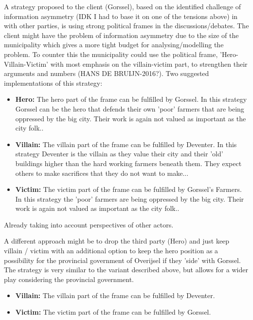 A strategy proposed to the client (Gorssel), based on the identified challenge of information asymmetry (IDK I had to base it on one of the tensions above) in with other parties, is using strong political frames in the discussions/debates. The client might have the problem of information asymmetry due to the size of the municipality which gives a more tight budget for analysing/modelling the problem. To counter this the municipality could use the political frame, 'Hero-Villain-Victim' with most emphasis on the villain-victim part, to strengthen their arguments and numbers (HANS DE BRUIJN-2016?). Two suggested implementations of this strategy:
\begin{itemize}
    \item \textbf{Hero:} The hero part of the frame can be fulfilled by Gorssel. In this strategy Gorssel can be the hero that defends their own 'poor' farmers that are being oppressed by the big city. Their work is again not valued as important as the city folk.. 
    \item \textbf{Villain:} The villain part of the frame can be fulfilled by Deventer. In this strategy Deventer is the villain as they value their city and their 'old' buildings higher than the hard working farmers beneath them. They expect others to make sacrifices that they do not want to make...
    \item \textbf{Victim:} The victim part of the frame can be fulfilled by Gorssel's Farmers. In this strategy the 'poor' farmers  are being oppressed by the big city. Their work is again not valued as important as the city folk..
\end{itemize}

Already taking into account perspectives of other actors.

\noindent A different approach might be to drop the third party (Hero) and just keep villain / victim with an additional option to keep the hero position as a possibility for the provincial government of Overijsel if they 'side' with Gorssel. The strategy is very similar to the variant described above, but allows for a wider play considering the provincial government. 
\begin{itemize}
    \item \textbf{Villain:} The villain part of the frame can be fulfilled by Deventer.
    \item \textbf{Victim:} The victim part of the frame can be fulfilled by Gorssel.
\end{itemize}

